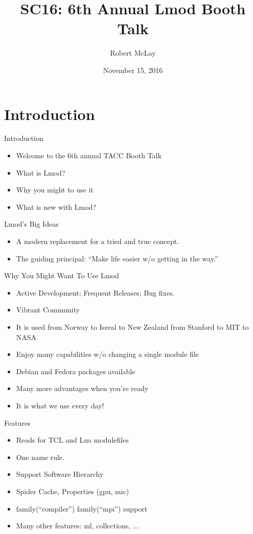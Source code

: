 \documentclass{beamer}
\title{SC16: 6th Annual Lmod Booth Talk}
\author{Robert McLay}
\institute{The Texas Advanced Computing Center}
\date{November 15, 2016}  %
\begin{document}
\begin{frame}
  \titlepage
\end{frame}

\section{Introduction}

\begin{frame}{Introduction}
  \begin{itemize}
    \item Welcome to the 6th annual TACC Booth Talk
    \item What is Lmod?
    \item Why you might to use it
    \item What is new with Lmod?
  \end{itemize}
\end{frame}

\begin{frame}{Lmod's Big Ideas}
  \begin{itemize}
    \item A modern replacement for a tried and true concept.
    \item The guiding principal: ``Make life easier w/o getting in
      the way.''
  \end{itemize}
\end{frame}

\begin{frame}{Why You Might Want To Use Lmod}
  \begin{itemize}
    \item Active Development;  Frequent Releases; Bug fixes.
    \item Vibrant Community
    \item It is used from Norway to Isreal to New Zealand from Stanford to MIT to NASA
    \item Enjoy many capabilities w/o changing a single module file
    \item Debian and Fedora packages available
    \item Many more advantages when you're ready
    \item It is what we use every day!
  \end{itemize}
\end{frame}

\begin{frame}{Features}
  \begin{itemize}
    \item Reads for TCL and Lua modulefiles
    \item One name rule.
    \item Support Software Hierarchy
    \item Spider Cache, Properties (gpu, mic)
    \item family(``compiler'') family(``mpi'') support
    \item Many other features: ml, collections, ...
  \end{itemize}
\end{frame}
\end{document}
